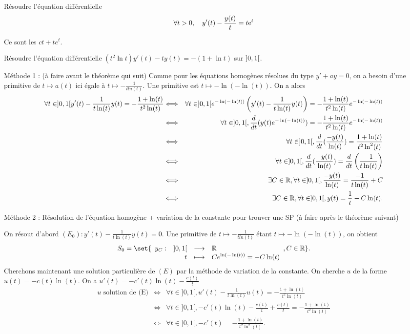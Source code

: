 \documentclass{magnoliaold}
\begin{document}
\begin{exos}
\exo Résoudre l'équation différentielle
  \[\forall t>0 ,\quad y'(t)-\frac{y(t)}{t}=t{\rm e}^t\]
  \begin{sol}
  Ce sont les $ct+te^t$.
  \end{sol}
\exo Résoudre l'équation différentielle
  $(t^2\ln t)y'(t)-ty(t)=-(1+\ln t)$ sur $\left]0,1\right[$.
  \begin{victor}
  \begin{sol}
  Méthode 1 : (à faire avant le théorème qui suit)
  Comme pour les équations homogènes résolues du type $y'+ay=0$, on a besoin d'une primitive de $t\mapsto a(t)$ ici égale à $t\mapsto -\frac{1}{tln(t)}$. Une primitive est $t\mapsto -\ln(-\ln(t))$. On a alors
  \begin{eqnarray*}
\forall t \in ]0,1[ y'(t)-\frac{1}{t\ln(t)} y(t)=-\frac{1+\ln(t)}{t^2\ln(t)} &\Longleftrightarrow& \forall t \in ]0,1[ e^{-\ln(-\ln(t))}\left(y'(t)-\frac{1}{t\ln(t)} y(t)\right)=-\frac{1+\ln(t)}{t^2\ln(t)}e^{-\ln(-\ln(t))} \\
&\Longleftrightarrow& \forall t \in ]0,1[, \frac{d}{dt}(y(t)e^{-\ln(-\ln(t))})=-\frac{1+\ln(t)}{t^2\ln(t)}e^{-\ln(-\ln(t))} \\
&\Longleftrightarrow& \forall t \in ]0,1[, \frac{d}{dt}(\frac{-y(t)}{\ln(t)})=\frac{1+\ln(t)}{t^2\ln^2(t)} \\
&\Longleftrightarrow& \forall t \in ]0,1[, \frac{d}{dt}(\frac{-y(t)}{\ln(t)})=\frac{d}{dt}\left(\frac{-1}{t\ln(t)}\right) \\
&\Longleftrightarrow& \exists C\in \mathbb{R}, \forall t \in ]0,1[, \frac{-y(t)}{\ln(t)}=\frac{-1}{t\ln(t)}+C\\
&\Longleftrightarrow& \exists C\in \mathbb{R}, \forall t \in ]0,1[, y(t)=\frac{1}{t}-C\ln(t).
\end{eqnarray*}
  
  Méthode 2 : Résolution de l'équation homogène + variation de la constante pour trouver une SP (à faire après le théorème suivant)
  
  On résout d'abord $(E_0): y'(t)-\frac{1}{t\ln(t)} y(t)=0$.
  Une primitive de $t\mapsto -\frac{1}{tln(t)}$ étant $t\mapsto -\ln(-\ln(t))$, on obtient $$S_0=\set{\dspappli{y_C}{]0,1[}{\R}{t}{Ce^{\ln(-\ln(t))}=-C\ln(t)}, C\in \R}.$$
  Cherchons maintenant une solution particulière de $(E)$ par la méthode de variation de la constante. On cherche $u$ de la forme $u(t)=-c(t)\ln(t)$. On a $u'(t)=-c'(t)\ln(t)-\frac{c(t)}{t}$
  \begin{eqnarray*}
  u \text{ solution de (E)} &\Longleftrightarrow & \forall t \in ]0,1[, u'(t)-\frac{1}{t\ln(t)}u(t)=-\frac{1+\ln(t)}{t^2\ln(t)}\\
  &\Longleftrightarrow & \forall t \in ]0,1[, -c'(t)\ln(t)-\frac{c(t)}{t}+\frac{c(t)}{t}=-\frac{1+\ln(t)}{t^2\ln(t)}\\
  &\Longleftrightarrow & \forall t \in ]0,1[, -c'(t)=-\frac{1+\ln(t)}{t^2\ln^2(t)}.
  \end{eqnarray*}
  

\end{sol}
\end{victor}
\end{exos}
\end{document}
